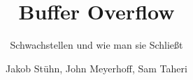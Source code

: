 \documentclass[aspectratio=169]{beamer}
\title{Buffer Overflow}
\subtitle{Schwachstellen und wie man sie Schließt}
\author{Jakob Stühn, John Meyerhoff, Sam Taheri}
\institute{H-BRS}
\begin{document}
\frame{\titlepage}






\end{document}

